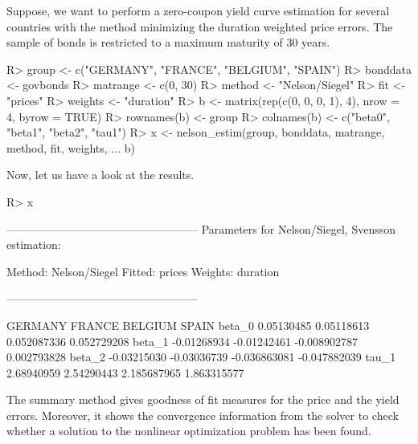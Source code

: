 Suppose, we want to perform a zero-coupon yield curve estimation for several countries with the \cite{Nelson1987} method minimizing the duration weighted price errors. The sample of bonds is restricted to a maximum maturity of 30 years. 

\begin{Schunk}
\begin{Sinput}
R> group <- c("GERMANY", "FRANCE", "BELGIUM", "SPAIN")
R> bonddata <- govbonds
R> matrange <- c(0, 30)
R> method <- "Nelson/Siegel"
R> fit <- "prices"
R> weights <- "duration"
R> b <- matrix(rep(c(0, 0, 0, 1), 4), nrow = 4, byrow = TRUE)
R> rownames(b) <- group
R> colnames(b) <- c("beta0", "beta1", "beta2", "tau1")
R> x <- nelson_estim(group, bonddata, matrange, method, fit, weights, 
...    b)
\end{Sinput}
\end{Schunk}

Now, let us have a look at the results.

\begin{Schunk}
\begin{Sinput}
R> x
\end{Sinput}
\begin{Soutput}
---------------------------------------------------
Parameters for Nelson/Siegel, Svensson estimation:

Method: Nelson/Siegel 
Fitted: prices 
Weights: duration 

---------------------------------------------------

           GERMANY      FRANCE      BELGIUM        SPAIN
beta_0  0.05130485  0.05118613  0.052087336  0.052729208
beta_1 -0.01268934 -0.01242461 -0.008902787  0.002793828
beta_2 -0.03215030 -0.03036739 -0.036863081 -0.047882039
tau_1   2.68940959  2.54290443  2.185687965  1.863315577
\end{Soutput}
\end{Schunk}

The summary method gives goodness of fit measures for the price and the yield errors. Moreover, it shows the convergence information from the solver to check whether a solution to the nonlinear optimization problem has been found.

